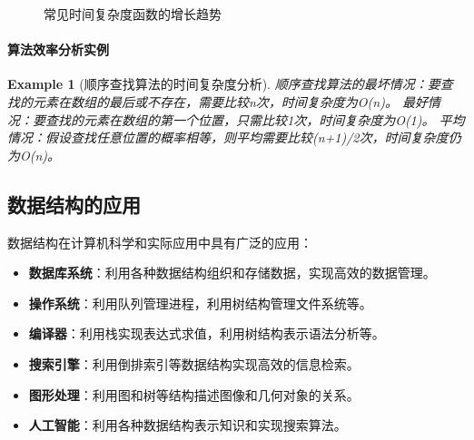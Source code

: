 \documentclass{../../note}
\newtheorem{example}{Example}
\begin{document}
\begin{figure}[h]
  \centering
  \caption{常见时间复杂度函数的增长趋势}
\end{figure}

\paragraph{算法效率分析实例}
\begin{example}[顺序查找算法的时间复杂度分析]
  顺序查找算法的最坏情况：要查找的元素在数组的最后或不存在，需要比较n次，时间复杂度为O(n)。
  最好情况：要查找的元素在数组的第一个位置，只需比较1次，时间复杂度为O(1)。
  平均情况：假设查找任意位置的概率相等，则平均需要比较(n+1)/2次，时间复杂度仍为O(n)。
\end{example}

\subsection{数据结构的应用}

数据结构在计算机科学和实际应用中具有广泛的应用：

\begin{itemize}
  \item \textbf{数据库系统}：利用各种数据结构组织和存储数据，实现高效的数据管理。
  \item \textbf{操作系统}：利用队列管理进程，利用树结构管理文件系统等。
  \item \textbf{编译器}：利用栈实现表达式求值，利用树结构表示语法分析等。
  \item \textbf{搜索引擎}：利用倒排索引等数据结构实现高效的信息检索。
  \item \textbf{图形处理}：利用图和树等结构描述图像和几何对象的关系。
  \item \textbf{人工智能}：利用各种数据结构表示知识和实现搜索算法。
\end{itemize}
\end{document}
